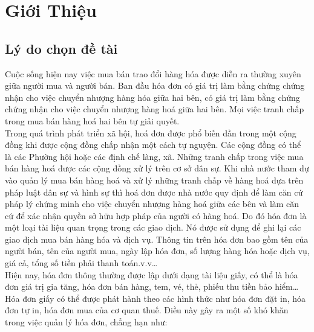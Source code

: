 \chapter{Giới Thiệu}

\section{Lý do chọn đề tài}
Cuộc sống hiện nay việc mua bán trao đổi hàng hóa được diễn ra thường xuyên giữa người mua và người bán. Ban đầu hóa đơn có giá trị làm bằng chứng chứng nhận cho việc chuyển nhượng hàng hóa giữa hai bên, có giá trị làm bằng chứng chứng nhận cho việc chuyển nhượng hàng hoá giữa hai bên. Mọi việc tranh chấp trong mua bán hàng hoá hai bên tự giải quyết. \\
\indent Trong quá trình phát triển xã hội, hoá đơn được phổ biến dần trong một cộng đồng khi được cộng đồng chấp nhận một cách tự nguyện. Các cộng đồng có thể là các Phường hội hoặc các định chế làng, xã. Những tranh chấp trong việc mua bán hàng hoá được các cộng đồng xử lý trên cơ sở dân sự. Khi nhà nước tham dự vào quản lý mua bán hàng hoá và xử lý những tranh chấp về hàng hoá dựa trên pháp luật dân sự và hình sự thì hoá đơn được nhà nước quy định để làm căn cứ pháp lý chứng minh cho việc chuyển nhượng hàng hoá giữa các bên và làm căn cứ để xác nhận quyền sở hữu hợp pháp của người có hàng hoá. Do đó hóa đơn là một loại tài liệu quan trọng trong các giao dịch. Nó được sử dụng để ghi lại các giao dịch mua bán hàng hóa và dịch vụ. Thông tin trên hóa đơn bao gồm tên của người bán, tên của người mua, ngày lập hóa đơn, số lượng hàng hóa hoặc dịch vụ, giá cả, tổng số tiền phải thanh toán.v.v\dots \\
\indent Hiện nay, hóa đơn thông thường được lập dưới dạng tài liệu giấy, có thể là hóa đơn giá trị gia tăng, hóa đơn bán hàng, tem, vé, thẻ, phiếu thu tiền bảo hiểm\dots Hóa đơn giấy có thể được phát hành theo các hình thức như hóa đơn đặt in, hóa đơn tự in, hóa đơn mua của cơ quan thuế. Điều này gây ra một số khó khăn trong việc quản lý hóa đơn, chẳng hạn như:
